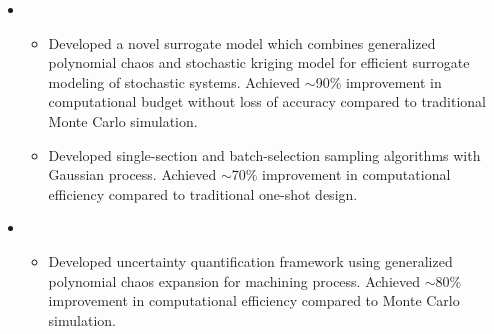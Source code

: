 \documentclass[10pt]{article}
\begin{document}
\begin{itemize}
\begin{itemize}[label=$\bullet$]
			\item {}
			\vspace{-0.5em}
			\begin{itemize}[label=$-$]
				\setlength\itemsep{0.5pt}
				\item Developed a novel surrogate model which combines generalized polynomial chaos and stochastic kriging model for efficient surrogate modeling of stochastic systems. Achieved $\sim$90\% improvement in computational budget without loss of accuracy compared to traditional Monte Carlo simulation.
			
				\item Developed single-section and batch-selection sampling algorithms with Gaussian process. Achieved $\sim$70\% improvement in computational efficiency compared to traditional one-shot design.
			\end{itemize}
	    
			\item {}
			\vspace{-0.5em}
			\begin{itemize}[label=$-$]
				\setlength\itemsep{0.5pt}
				\item Developed uncertainty quantification framework using generalized polynomial chaos expansion for machining process. Achieved $\sim$80\% improvement in computational efficiency compared to Monte Carlo simulation.
			\end{itemize}
	\end{itemize}
\end{itemize}


\vspace{-1.5em}
\end{document}
